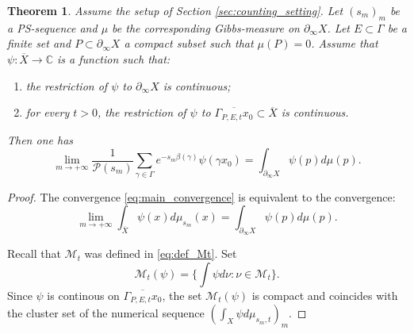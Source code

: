 \documentclass[12pt]{amsbook}%
\newtheorem{thm}{Theorem}[chapter]
\theoremstyle{definition}
\newtheorem{question}[thm]{Question}
\theoremstyle{remark}
\numberwithin{section}{chapter}
\numberwithin{subsection}{section}
\numberwithin{figure}{chapter}
\def\bC{{\mathbb{C}}}
\def\cM{{\mathscr{M}}}
\def\cP{{\mathscr{P}}}
\def\geo{\partial_\infty}
\def\ol{\overline}
\def\kap{}
\begin{document}
{{%
%
%










\begin{thm} \label{thm:integration_partial_measures}
Assume the setup of Section \ref{sec:counting_setting}. Let $(s_m)_m$ be a PS-sequence and $\mu$ be the corresponding Gibbs-measure on $\geo X$. Let $E\subset \Gamma$ be a finite set and $P\subset \geo X$ a compact subset such that $\mu(P)=0$. Assume that $\psi:\ol{X}\rightarrow \bC$ is a function such that: 
\begin{enumerate}
 \item[(i)] the restriction of $\psi$ to %
 $\geo X$ %
 is continuous;   
 \item[(ii)] for every $t >0$, the restriction of $\psi$ to $\overline{\Gamma_{P,E,t}x_0}\subset \overline{X}$ is continuous.
\end{enumerate} 
Then one has
\begin{equation}\label{eq:main_convergence}
\lim_{m \rightarrow +\infty} \dfrac{1}{\cP(s_m)}\sum_{\gamma \in \Gamma} e^{-s_m \beta(\gamma)} \psi(\gamma x_0) = \int_{\geo X} 
\psi(p) d\mu(p).
\end{equation}
\end{thm}



\begin{proof}
The convergence \eqref{eq:main_convergence} is equivalent to the convergence:
\begin{equation}\label{eq:main_convergence1}
\lim_{m \rightarrow +\infty} \int_{\overline{X}}\psi(x)d\mu_{s_m}(x) = \int_{\geo X} \psi(p)d\mu(p).
\end{equation}

Recall that $\cM_t$ was defined in \eqref{eq:def_Mt}. Set
\[
\cM_t(\psi)=\{\int \psi d\nu: \nu\in \cM_t\}.
\]
Since $\psi$ is continous on $\overline{\Gamma_{P,E,t}x_0}$, the set $\cM_t(\psi)$ is compact and coincides with the cluster set of the numerical sequence $(\int_X \psi  d\mu_{s_m,t})_m$.


\end{proof}}}
\end{document}
